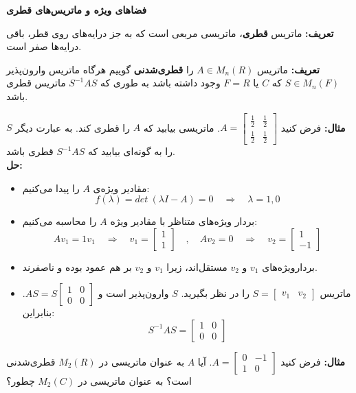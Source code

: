 
\textbf{فضا‌های ویژه و ماتریس‌های قطری}

\textbf{تعریف:}
ماتریس \textbf{قطری}، ماتریسی مربعی است که به جز درایه‌های روی قطر، باقی درایه‌ها صفر است.

\textbf{تعریف:} ماتریس $A\in M_n(R)$ را \textbf{قطری‌شدنی} گوییم هرگاه ماتریس وارون‌پذیر $S\in M_n(F)$ که $F = R \text{ یا } {C}$ وجود داشته باشد  به طوری که $S^{-1}AS$ ماتریس قطری باشد.

\textbf{مثال:} فرض کنید $A = \begin{bmatrix}
\frac{1}{2} & \frac{1}{2}\\
\frac{1}{2} & \frac{1}{2}
\end{bmatrix}$. ماتریسی بیابید که $A$ را قطری کند. به عبارت دیگر $S$ را به گونه‌ای بیابید که $S^{-1}AS$ قطری باشد.\\
\textbf{حل:}
\begin{itemize}
	\item مقادیر ویژه‌ی $A$ را پیدا می‌کنیم:
	$$f(\lambda) = det\: (\lambda I -A) = 0 \quad \Rightarrow \quad \lambda = 1 , 0$$
	\item بردار‌ ویژه‌های متناظر با مقادیر ویژه $A$ را محاسبه می‌کنیم:
	$$Av_1 = 1v_1 \quad \Rightarrow \quad v_1 = \begin{bmatrix}
	1\\1
	\end{bmatrix} \quad , \quad Av_2 = 0 \quad \Rightarrow \quad v_2 = \begin{bmatrix}
	1\\-1
	\end{bmatrix}$$
	\item بردار‌ویژه‌های $v_1$ و $v_2$ مستقل‌اند، زیرا $v_1$ و $v_2$ بر هم عمود بوده و ناصفرند.\\
	\item ماتریس $S = \begin{bmatrix}
	v_1 &v_2
	\end{bmatrix}$ را در نظر بگیرید. $S$ وارون‌پذیر است و $AS = S\begin{bmatrix}
	1&0\\
	0&0
	\end{bmatrix}$. بنابراین:
	$$S^{-1}AS = \begin{bmatrix}
	1&0\\
	0&0
	\end{bmatrix}$$
\end{itemize}
\textbf{مثال:}
فرض کنید $A =\begin{bmatrix}
0&-1\\
1&0
\end{bmatrix} $.
آیا $A$ به عنوان ماتریسی در $M_2(R)$ قطری‌شدنی است؟ به عنوان ماتریسی در $M_2(C)$ چطور؟\\
